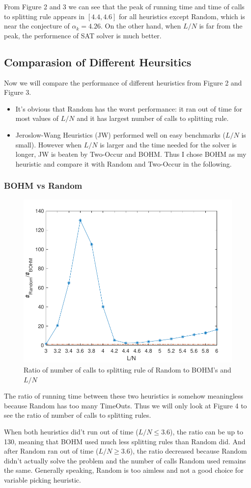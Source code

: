 \documentclass[12pt]{article}
\begin{document}
	From Figure 2 and 3 we can see that the peak of running time and time of calls to splitting rule appears in $[4.4,4.6]$ for all heuristics except Random, which is near the conjecture of $\alpha_k=4.26$. On the other hand, when $L/N$ is far from the peak, the performence of SAT solver is much better.
	
	\subsection{Comparasion of Different Heursitics}	
	Now we will compare the performance of different heuristics from Figure 2 and Figure 3.
	\begin{itemize}
		\item It's obvious that Random has the worst performance: it ran out of time for most values of $L/N$ and it has largest number of calls to splitting rule.
		\item Jeroslow-Wang Heuristics (JW) performed well on easy benchmarks ($L/N$ is small). However when $L/N$ is larger and the time needed for the solver is longer, JW is beaten by Two-Occur and BOHM. Thus I chose BOHM as my heuristic and compare it with Random and Two-Occur in the following.
	\end{itemize} 
	\subsubsection{BOHM vs Random}
		\begin{figure}[h!]
		\centering
		\includegraphics[width=0.5\linewidth]{cRvsB}
		\caption{Ratio of number of calls to splitting rule of Random to BOHM's and $L/N$}
		\label{fig:cRvsB}
	\end{figure}
	The ratio of running time between these two heuristics is somehow meaningless because Random has too many TimeOuts. Thus we will only look at Figure 4 to see the ratio of number of calls to splitting rules. 
	
	When both heuristics did't run out of time ($L/N\le 3.6$), the ratio can be up to 130, meaning that BOHM used much less splitting rules than Random did. And after Random ran out of time ($L/N\ge 3.6$), the ratio decreased because Random didn't actually solve the problem and the number of calls Random used remains the same. Generally speaking, Random is too aimless and not a good choice for variable picking heuristic. 
\end{document}

